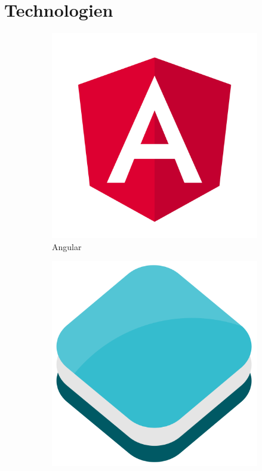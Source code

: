 \documentclass[a4paper,12pt]{article}
\begin{document}
\section{Technologien}
\begin{figure}[H]
    \centering
    \begin{subfigure}[b]{0.3\linewidth}
        \includegraphics[width=0.8\linewidth]{assets/angular.png}
        \caption{Angular}
    \end{subfigure}
    \begin{subfigure}[b]{0.3\linewidth}
        \includegraphics[width=0.8\linewidth]{assets/openlayers.png}

\end{subfigure}
\end{figure}
\end{document}
